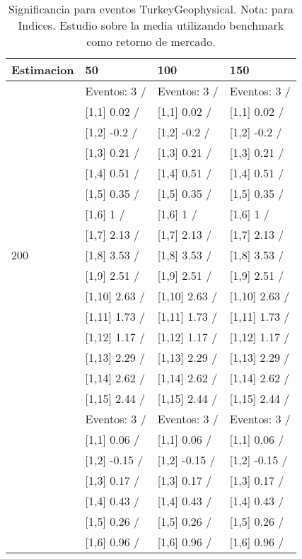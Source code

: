 \begin{table}

\caption{Significancia para eventos TurkeyGeophysical. Nota: para Indices. Estudio sobre la media utilizando benchmark como retorno de mercado.}
\centering
\begin{tabular}[t]{llll}
\toprule
Estimacion & 50 & 100 & 150\\
\midrule
 & Eventos:  3 / & Eventos:  3 / & Eventos:  3 /\\
 & {}[1,1] 0.02  / & {}[1,1] 0.02  / & {}[1,1] 0.02  /\\
 & {}[1,2] -0.2  / & {}[1,2] -0.2  / & {}[1,2] -0.2  /\\
 & {}[1,3] 0.21  / & {}[1,3] 0.21  / & {}[1,3] 0.21  /\\
 & {}[1,4] 0.51  / & {}[1,4] 0.51  / & {}[1,4] 0.51  /\\
\addlinespace
 & {}[1,5] 0.35  / & {}[1,5] 0.35  / & {}[1,5] 0.35  /\\
 & {}[1,6] 1  / & {}[1,6] 1  / & {}[1,6] 1  /\\
 & {}[1,7] 2.13  / & {}[1,7] 2.13  / & {}[1,7] 2.13  /\\
200 & {}[1,8] 3.53  / & {}[1,8] 3.53  / & {}[1,8] 3.53  /\\
 & {}[1,9] 2.51  / & {}[1,9] 2.51  / & {}[1,9] 2.51  /\\
\addlinespace
 & {}[1,10] 2.63  / & {}[1,10] 2.63  / & {}[1,10] 2.63  /\\
 & {}[1,11] 1.73  / & {}[1,11] 1.73  / & {}[1,11] 1.73  /\\
 & {}[1,12] 1.17  / & {}[1,12] 1.17  / & {}[1,12] 1.17  /\\
 & {}[1,13] 2.29  / & {}[1,13] 2.29  / & {}[1,13] 2.29  /\\
 & {}[1,14] 2.62  / & {}[1,14] 2.62  / & {}[1,14] 2.62  /\\
\addlinespace
 & {}[1,15] 2.44  / & {}[1,15] 2.44  / & {}[1,15] 2.44  /\\
 & Eventos:  3 / & Eventos:  3 / & Eventos:  3 /\\
 & {}[1,1] 0.06  / & {}[1,1] 0.06  / & {}[1,1] 0.06  /\\
 & {}[1,2] -0.15  / & {}[1,2] -0.15  / & {}[1,2] -0.15  /\\
 & {}[1,3] 0.17  / & {}[1,3] 0.17  / & {}[1,3] 0.17  /\\
\addlinespace
 & {}[1,4] 0.43  / & {}[1,4] 0.43  / & {}[1,4] 0.43  /\\
 & {}[1,5] 0.26  / & {}[1,5] 0.26  / & {}[1,5] 0.26  /\\
 & {}[1,6] 0.96  / & {}[1,6] 0.96  / & {}[1,6] 0.96  /\\

\end{tabular}
\end{table}
